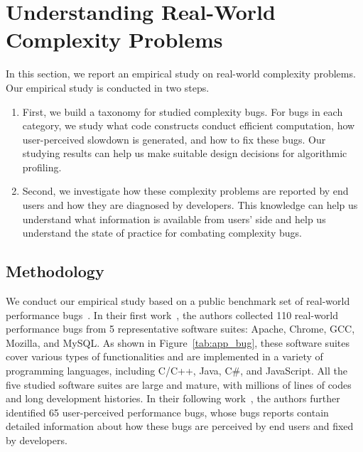 \newpage
\section{Understanding Real-World Complexity Problems}
\label{sec:study}

In this section, we report an empirical study on real-world 
complexity problems. Our empirical study is conducted in two steps.

\begin{enumerate}

\item First, we build a taxonomy for studied complexity bugs. 
For bugs in each category, 
we study what code constructs conduct efficient computation,
how user-perceived slowdown is generated, and how to fix these bugs. 
Our studying results can help us 
make suitable design decisions for algorithmic profiling. 

\item Second, we investigate how these complexity problems are reported by end users
and how they are diagnosed by developers. 
This knowledge can help us understand what information is available from users' side
and help us understand the 
state of practice for combating complexity bugs.


\end{enumerate}

\subsection{Methodology}
\label{sec:meth}



We conduct our empirical study based on a public benchmark set of 
real-world performance bugs~\cite{PerfBug,SongOOPSLA2014}. 
In their first work~\cite{PerfBug}, 
the authors collected 110 real-world performance bugs from 5 representative 
software suites: Apache, Chrome, GCC, Mozilla, and MySQL. 
As shown in Figure~\ref{tab:app_bug}, 
these software suites cover various types of functionalities and are implemented 
in a variety of programming languages, including C/C++, Java, C\#, and JavaScript. 
All the five studied software suites are large and mature, 
with millions of lines of codes and long development histories. 
In their following work~\cite{SongOOPSLA2014}, 
the authors further identified 65 user-perceived performance bugs, 
whose bugs reports contain detailed information 
about how these bugs are perceived by end users and fixed by developers.  

